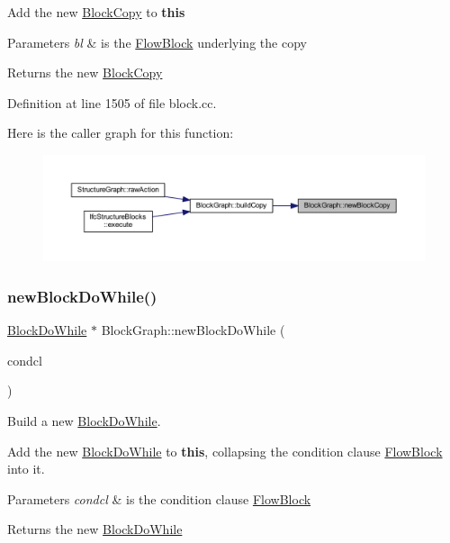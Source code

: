 Add the new \mbox{\hyperlink{class_block_copy}{Block\+Copy}} to {\bfseries{this}} 
\begin{DoxyParams}{Parameters}
{\em bl} & is the \mbox{\hyperlink{class_flow_block}{Flow\+Block}} underlying the copy \\
\hline
\end{DoxyParams}
\begin{DoxyReturn}{Returns}
the new \mbox{\hyperlink{class_block_copy}{Block\+Copy}} 
\end{DoxyReturn}


Definition at line 1505 of file block.\+cc.

Here is the caller graph for this function\+:
\nopagebreak
\begin{figure}[H]
\begin{center}
\leavevmode
\includegraphics[width=350pt]{class_block_graph_a29ab85a9a7a5d1f6785d2e93ce1e502d_icgraph}
\end{center}
\end{figure}
\mbox{\label{class_block_graph_ae61c4c6c6ab865760a6855ced92ae809}} 
\subsubsection{\texorpdfstring{newBlockDoWhile()}{newBlockDoWhile()}}
{\footnotesize\ttfamily \mbox{\hyperlink{class_block_do_while}{Block\+Do\+While}} $\ast$ Block\+Graph\+::new\+Block\+Do\+While (\begin{DoxyParamCaption}\item[{\mbox{\hyperlink{class_flow_block}{Flow\+Block}} $\ast$}]{condcl }\end{DoxyParamCaption})}



Build a new \mbox{\hyperlink{class_block_do_while}{Block\+Do\+While}}. 

Add the new \mbox{\hyperlink{class_block_do_while}{Block\+Do\+While}} to {\bfseries{this}}, collapsing the condition clause \mbox{\hyperlink{class_flow_block}{Flow\+Block}} into it. 
\begin{DoxyParams}{Parameters}
{\em condcl} & is the condition clause \mbox{\hyperlink{class_flow_block}{Flow\+Block}} \\
\hline
\end{DoxyParams}
\begin{DoxyReturn}{Returns}
the new \mbox{\hyperlink{class_block_do_while}{Block\+Do\+While}} 
\end{DoxyReturn}


